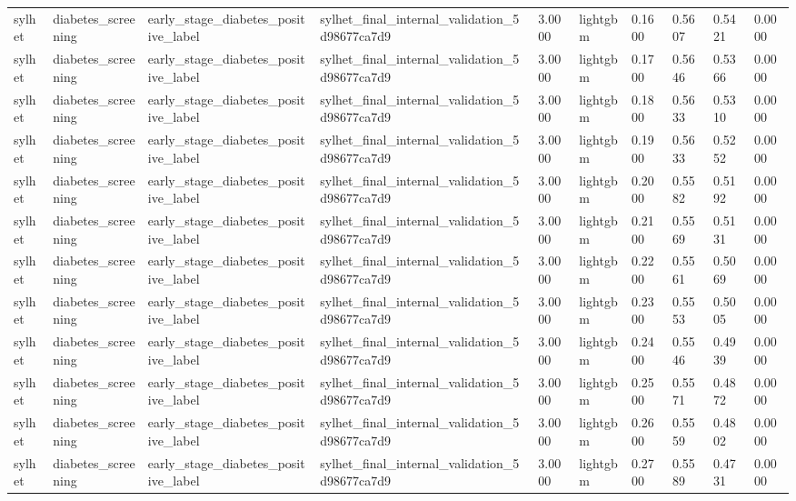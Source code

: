 \begin{tabular}{llllllllll}
sylhet & diabetes\_screening & early\_stage\_diabetes\_positive\_label & sylhet\_final\_internal\_validation\_5d98677ca7d9 & 3.0000 & lightgbm & 0.1600 & 0.5607 & 0.5421 & 0.0000 \\
sylhet & diabetes\_screening & early\_stage\_diabetes\_positive\_label & sylhet\_final\_internal\_validation\_5d98677ca7d9 & 3.0000 & lightgbm & 0.1700 & 0.5646 & 0.5366 & 0.0000 \\
sylhet & diabetes\_screening & early\_stage\_diabetes\_positive\_label & sylhet\_final\_internal\_validation\_5d98677ca7d9 & 3.0000 & lightgbm & 0.1800 & 0.5633 & 0.5310 & 0.0000 \\
sylhet & diabetes\_screening & early\_stage\_diabetes\_positive\_label & sylhet\_final\_internal\_validation\_5d98677ca7d9 & 3.0000 & lightgbm & 0.1900 & 0.5633 & 0.5252 & 0.0000 \\
sylhet & diabetes\_screening & early\_stage\_diabetes\_positive\_label & sylhet\_final\_internal\_validation\_5d98677ca7d9 & 3.0000 & lightgbm & 0.2000 & 0.5582 & 0.5192 & 0.0000 \\
sylhet & diabetes\_screening & early\_stage\_diabetes\_positive\_label & sylhet\_final\_internal\_validation\_5d98677ca7d9 & 3.0000 & lightgbm & 0.2100 & 0.5569 & 0.5131 & 0.0000 \\
sylhet & diabetes\_screening & early\_stage\_diabetes\_positive\_label & sylhet\_final\_internal\_validation\_5d98677ca7d9 & 3.0000 & lightgbm & 0.2200 & 0.5561 & 0.5069 & 0.0000 \\
sylhet & diabetes\_screening & early\_stage\_diabetes\_positive\_label & sylhet\_final\_internal\_validation\_5d98677ca7d9 & 3.0000 & lightgbm & 0.2300 & 0.5553 & 0.5005 & 0.0000 \\
sylhet & diabetes\_screening & early\_stage\_diabetes\_positive\_label & sylhet\_final\_internal\_validation\_5d98677ca7d9 & 3.0000 & lightgbm & 0.2400 & 0.5546 & 0.4939 & 0.0000 \\
sylhet & diabetes\_screening & early\_stage\_diabetes\_positive\_label & sylhet\_final\_internal\_validation\_5d98677ca7d9 & 3.0000 & lightgbm & 0.2500 & 0.5571 & 0.4872 & 0.0000 \\
sylhet & diabetes\_screening & early\_stage\_diabetes\_positive\_label & sylhet\_final\_internal\_validation\_5d98677ca7d9 & 3.0000 & lightgbm & 0.2600 & 0.5559 & 0.4802 & 0.0000 \\
sylhet & diabetes\_screening & early\_stage\_diabetes\_positive\_label & sylhet\_final\_internal\_validation\_5d98677ca7d9 & 3.0000 & lightgbm & 0.2700 & 0.5589 & 0.4731 & 0.0000 \\

\end{tabular}

